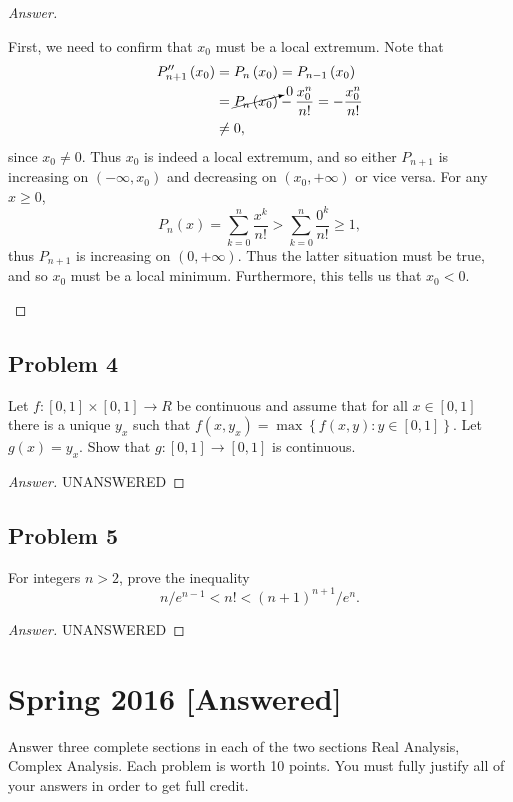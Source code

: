\documentclass[12pt]{article}
\newcommand\paren[1]{\left( #1 \right)}
\newcommand\setb[1]{\left \{ #1 \right \}}
\theoremstyle{definition}
\begin{document}
\begin{proof}[Answer]
\begin{enumerate}
        First, we need to confirm that $x_0$ must be a local extremum. Note that 
        \begin{align*}
            P_{n+1}'' \paren{ x_0 } & = P_{n} \paren{ x_0 } = P_{n-1} \paren{ x_0 } \\ 
            & = \cancelto{0}{P_n \paren{ x_0 }} - \frac{x_0^n}{n!} = -\frac{x_0^n}{n!} \\ 
            & \neq 0 , 
        \end{align*}
        since $x_0 \neq 0$. Thus $x_0$ is indeed a local extremum, and so either $P_{n+1}$ is increasing on $\paren{ -\infty, x_0 }$ and decreasing on $\paren{ x_0 , +\infty }$ or vice versa. For any $x \geq 0$, 
        \[
            P_n(x) = \sum\limits_{k = 0}^{n} \frac{x^k}{n!} > \sum\limits_{k = 0}^{n} \frac{0^k}{n!} \geq 1 , 
        \]
        thus $P_{n+1}$ is increasing on $(0,+\infty)$. Thus the latter situation must be true, and so $x_0$ must be a local minimum. Furthermore, this tells us that $x_0 < 0$. 
    \end{enumerate}
\end{proof}

\subsection{Problem 4}
Let $f : [0,1] \times [0,1] \to R$ be continuous and assume that for all $x \in [0,1]$ there is a unique $y_x$ such that $f(x,y_x) = \max \setb{ f(x,y) : y \in [0,1] }$. Let $g(x) = y_x$. Show that $g : [0,1] \to [0,1]$ is continuous. 
\begin{proof}[Answer]
    UNANSWERED
\end{proof}

\subsection{Problem 5}
For integers $n > 2$, prove the inequality 
\[
    n / e^{n-1} < n! < (n+1)^{n+1} / e^n . 
\]
\begin{proof}[Answer]
    UNANSWERED
\end{proof}

\newpage
\section{Spring 2016 [Answered]}
Answer three complete sections in each of the two sections Real Analysis, Complex Analysis. Each problem is worth 10 points. You must fully justify all of your answers in order to get full credit. 
\end{document}

